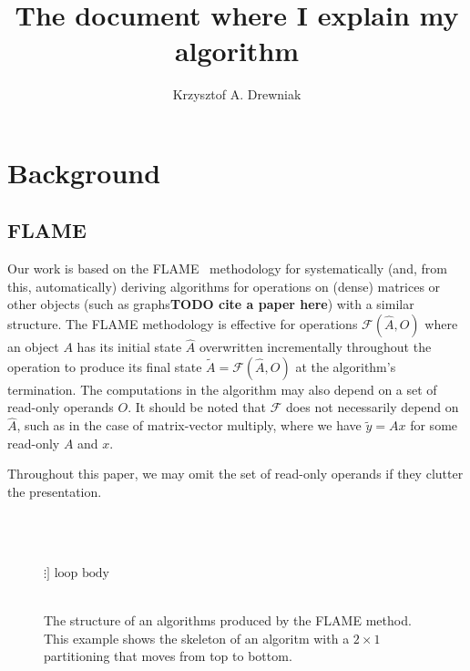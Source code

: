\documentclass[12pt,letterpaper]{article}
\title{The document where I explain my algorithm}
\author{Krzysztof A. Drewniak}
\newcommand*{\mycite}[1]{~\cite{#1}}
\newcommand*{\opF}{\mathcal{F}}
\begin{document}
\maketitle{}
\section{Background}
\subsection{FLAME}
Our work is based on the FLAME\mycite{Bientinesi2005,Low2013} methodology for systematically (and, from this, automatically) deriving algorithms for operations on (dense) matrices or other objects (such as graphs\textbf{TODO cite a paper here}) with a similar structure.
The FLAME methodology is effective for operations $\opF(\hat{A}, O)$ where an object $A$ has its initial state $\hat{A}$ overwritten incrementally throughout the operation to produce its final state $\widetilde{A} = \opF(\hat{A}, O)$ at the algorithm's termination.
The computations in the algorithm may also depend on a set of read-only operands $O$.
It should be noted that $\opF$ does not necessarily depend on $\hat{A}$, such as in the case of matrix-vector multiply, where we have $\widetilde{y} = Ax$ for some read-only $A$ and $x$.

Throughout this paper, we may omit the set of read-only operands if they clutter the presentation.

\begin{figure}[t]
  \def\?#1{}
  \centering
  \begin{FlameAlg}
    \\
    \\
      \\
      $\?[\vdots]\text{ loop body}$\\ %
      \\
    \FlaEndDo{}
  \end{FlameAlg}
  \caption{The structure of an algorithms produced by the FLAME method. This example shows the skeleton of an algoritm with a $2 \times 1$ partitioning that moves from top to bottom.}%
  \label{fig:alg_struct}
\end{figure}
\end{document}
